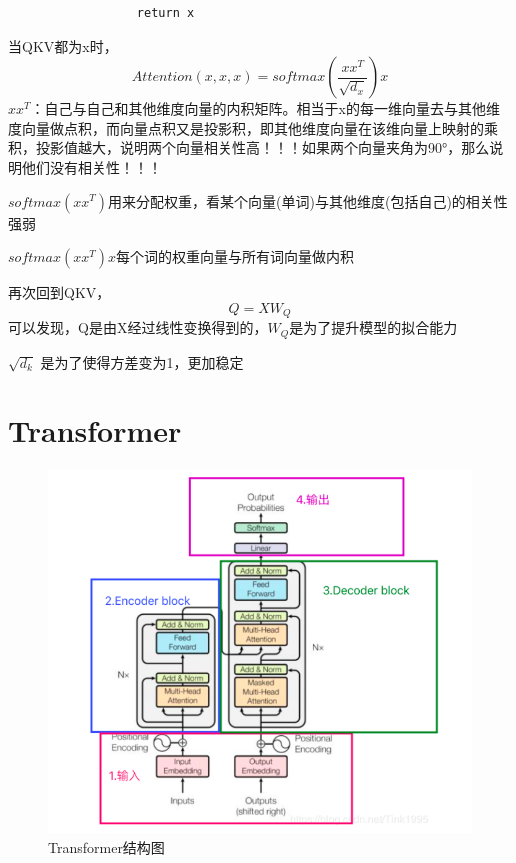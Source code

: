 \documentclass{article}
\begin{document}
\begin{sloppypar}
\begin{lstlisting}
                  return x
      \end{lstlisting}

      当QKV都为x时，
      $$
            Attention(x,x,x)=softmax(\frac{xx^T}{\sqrt{d_x}})x
      $$
      $xx^T$：自己与自己和其他维度向量的内积矩阵。相当于x的每一维向量去与其他维度向量做点积，而向量点积又是投影积，即其他维度向量在该维向量上映射的乘积，投影值越大，说明两个向量相关性高！！！如果两个向量夹角为90°，那么说明他们没有相关性！！！

      $softmax(xx^T)$用来分配权重，看某个向量(单词)与其他维度(包括自己)的相关性强弱

      $softmax(xx^T)x$每个词的权重向量与所有词向量做内积

      再次回到QKV，
      $$
            Q=XW_Q
      $$
      可以发现，Q是由X经过线性变换得到的，$W_Q$是为了提升模型的拟合能力

      $\sqrt{d_k}$ 是为了使得方差变为1，更加稳定

      \section{Transformer}

      \begin{figure}[ht]
            \centering
            \includegraphics[scale=0.75]{transformer}
            \caption{Transformer结构图}
            \label{Transformer}
      \end{figure}


\end{sloppypar}
\end{document}
